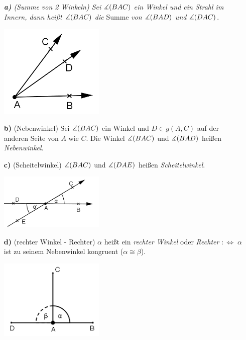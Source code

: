 \begin{defi}
\begin{enumerate}
\item[\emph{\textbf{a)}}] \emph{(Summe von 2 Winkeln)
Sei $\mbox{$\measuredangle$}(BAC)$ ein Winkel und  ein Strahl im Innern, dann
hei{\ss}t $\mbox{$\measuredangle$}(BAC)$ die} Summe \emph{von $\mbox{$\measuredangle$}(BAD)$ und $\mbox{$\measuredangle$}(DAC)$}.

\centerline{\includegraphics[width=5cm]{BILDER/1-2-12a-Winkel.png}}

\item[\textbf{b)}]
 (Nebenwinkel) Sei $\mbox{$\measuredangle$}(BAC)$ ein Winkel und $D\in
g(A,C)$ auf
    der anderen Seite von $A$ wie $C$. Die Winkel $\mbox{$\measuredangle$}(BAC)$ und
    $\mbox{$\measuredangle$}(BAD)$ hei{\ss}en \emph{Nebenwinkel}.




\item[\textbf{c)}] (Scheitelwinkel) $\mbox{$\measuredangle$}(BAC)$ und $\mbox{$\measuredangle$}(DAE)$ hei{\ss}en
\emph{Scheitelwinkel}.

\centerline{\includegraphics[width=5cm]{BILDER/1-2-12c-Winkel.png}}

\item[\textbf{d)}] (rechter Winkel - Rechter) $\alpha$ hei{\ss}t ein
\emph{rechter Winkel} oder \emph{Rechter}
$:\Longleftrightarrow\;\alpha$ ist zu seinem Nebenwinkel kongruent
($\alpha\cong\beta$).


\centerline{\includegraphics[width=5cm]{BILDER/1-2-12d-Rechter.png}}

\end{enumerate}
\end{defi}









